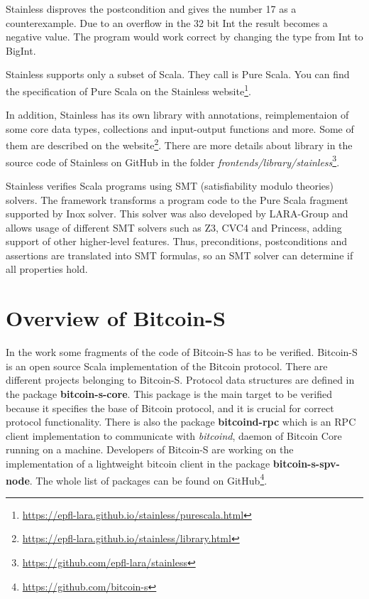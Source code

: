Stainless disproves the postcondition and gives the number 17 as a counterexample.
Due to an overflow in the 32 bit Int the result becomes a negative value.
The program would work correct by changing the type from Int to BigInt.

Stainless supports only a subset of Scala.
They call is Pure Scala.
You can find the specification of Pure Scala on the Stainless website\footnote{\url{https://epfl-lara.github.io/stainless/purescala.html}}.

In addition, Stainless has its own library with annotations, reimplementaion of some core data types, collections and input-output functions and more.
Some of them are described on the website\footnote{\url{https://epfl-lara.github.io/stainless/library.html}}.
There are more details about library in the source code of Stainless on GitHub in the folder \textit{frontends/library/stainless}\footnote{\url{https://github.com/epfl-lara/stainless}}.

Stainless verifies Scala programs using SMT (satisfiability modulo theories) solvers. 
The framework transforms a program code to the Pure Scala fragment supported by Inox solver.
This solver was also developed by LARA-Group and allows usage of different SMT solvers such as Z3, CVC4 and Princess, adding support of other higher-level features.
Thus, preconditions, postconditions and assertions are translated into SMT formulas, so an SMT solver can determine if all properties hold.\cite{Stainless:introduction}\cite{Stainless}


\section{Overview of Bitcoin-S}
\label{sec:bitcoin_s}

In the work some fragments of the code of Bitcoin-S has to be verified.
Bitcoin-S is an open source Scala implementation of the Bitcoin protocol. 
There are different projects belonging to Bitcoin-S.
Protocol data structures are defined in the package \textbf{bitcoin-s-core}.
This package is the main target to be verified because it specifies the base of Bitcoin protocol, and it is crucial for correct protocol functionality.
There is also the package \textbf{bitcoind-rpc} which is an RPC client implementation to communicate with \textit{bitcoind}, daemon of Bitcoin Core running on a machine.
Developers of Bitcoin-S are working on the implementation of a lightweight bitcoin client in the package \textbf{bitcoin-s-spv-node}.
The whole list of packages can be found on GitHub\footnote{\url{https://github.com/bitcoin-s}}.

